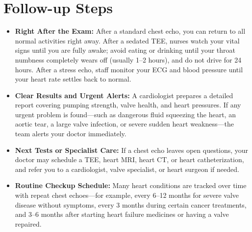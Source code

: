 \section{Follow-up Steps}
\begin{itemize}
\item \textbf{Right After the Exam:} After a standard chest echo, you can return to all normal activities right away. After a sedated TEE, nurses watch your vital signs until you are fully awake; avoid eating or drinking until your throat numbness completely wears off (usually 1--2 hours), and do not drive for 24 hours. After a stress echo, staff monitor your ECG and blood pressure until your heart rate settles back to normal.
\item \textbf{Clear Results and Urgent Alerts:} A cardiologist prepares a detailed report covering pumping strength, valve health, and heart pressures. If any urgent problem is found---such as dangerous fluid squeezing the heart, an aortic tear, a large valve infection, or severe sudden heart weakness---the team alerts your doctor immediately.
\item \textbf{Next Tests or Specialist Care:} If a chest echo leaves open questions, your doctor may schedule a TEE, heart MRI, heart CT, or heart catheterization, and refer you to a cardiologist, valve specialist, or heart surgeon if needed.
\item \textbf{Routine Checkup Schedule:} Many heart conditions are tracked over time with repeat chest echoes---for example, every 6--12 months for severe valve disease without symptoms, every 3 months during certain cancer treatments, and 3--6 months after starting heart failure medicines or having a valve repaired.
\end{itemize}


